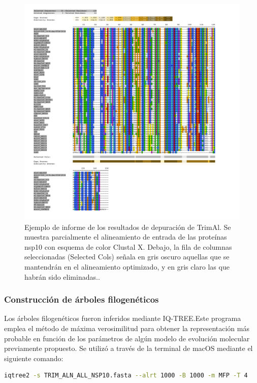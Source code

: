 \begin{figure}[!ht]
    \centering
    \includegraphics[width=1\textwidth]{img/fig4.pdf}
    \caption{Ejemplo de informe de los resultados de depuración de TrimAl. 
    Se muestra parcialmente el alineamiento de entrada de las proteínas 
    nsp10 con esquema de color Clustal X. Debajo, la fila de columnas 
    seleccionadas (Selected Cols) señala en gris oscuro aquellas que se 
    mantendrán en el alineamiento optimizado, y en gris claro las que 
    habrán sido eliminadas..}\label{fig:TrimAlexample}
\end{figure}

\subsubsection{Construcción de árboles filogenéticos}

Los árboles filogenéticos fueron inferidos mediante IQ-TREE.\@ Este programa 
emplea el método de máxima verosimilitud para obtener la representación más 
probable en función de los parámetros de algún modelo de evolución molecular
previamente propuesto. Se utilizó a través de la terminal de macOS mediante 
el siguiente comando:

\begin{lstlisting}[language=bash]
 iqtree2 -s TRIM_ALN_ALL_NSP10.fasta --alrt 1000 -B 1000 -m MFP -T 4
\end{lstlisting}

